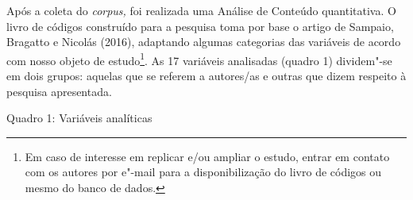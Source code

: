 Após a coleta do \emph{corpus,} foi realizada uma Análise de Conteúdo
quantitativa. O livro de códigos construído para a pesquisa toma por
base o artigo de Sampaio, Bragatto e Nicolás (2016), adaptando algumas
categorias das variáveis de acordo com nosso objeto de estudo\footnote{Em
  caso de interesse em replicar e/ou ampliar o estudo, entrar em contato
  com os autores por e"-mail para a disponibilização do livro de códigos
  ou mesmo do banco de dados.}. As 17 variáveis analisadas (quadro 1)
dividem"-se em dois grupos: aquelas que se referem a autores/as e outras
que dizem respeito à pesquisa apresentada.

\pagebreak

\begin{center}
Quadro 1: Variáveis analíticas
\end{center}


